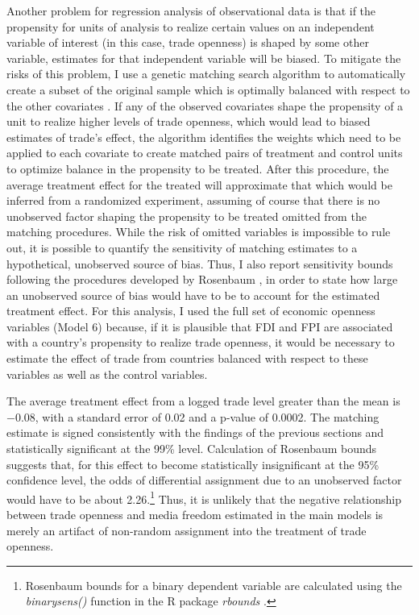 \documentclass[12pt,a4paper]{article}\usepackage[]{graphicx}\usepackage[]{color}
\begin{document}
Another problem for regression analysis of observational data is that if the propensity for units of analysis to realize certain values on an independent variable of interest (in this case, trade openness) is shaped by some other variable, estimates for that independent variable will be biased. To mitigate the risks of this problem, I use a genetic matching search algorithm to automatically create a subset of the original sample which is optimally balanced with respect to the other covariates \parencites{Diamond:2012jo}{Sekhon:2008wd}. If any of the observed covariates shape the propensity of a unit to realize higher levels of trade openness, which would lead to biased estimates of trade's effect, the algorithm identifies the weights which need to be applied to each covariate to create matched pairs of treatment and control units to optimize balance in the propensity to be treated. After this procedure, the average treatment effect for the treated will approximate that which would be inferred from a randomized experiment, assuming of course that there is no unobserved factor shaping the propensity to be treated omitted from the matching procedures. While the risk of omitted variables is impossible to rule out, it is possible to quantify the sensitivity of matching estimates to a hypothetical, unobserved source of bias. Thus, I also report sensitivity bounds following the procedures developed by Rosenbaum \parencite*{Rosenbaum:1988fl}, in order to state how large an unobserved source of bias would have to be to account for the estimated treatment effect. For this analysis, I used the full set of economic openness variables (Model 6) because, if it is plausible that FDI and FPI are associated with a country's propensity to realize trade openness, it would be necessary to estimate the effect of trade from countries balanced with respect to these variables as well as the control variables.

The average treatment effect from a logged trade level greater than the mean is \ensuremath{-0.08}, with a standard error of 0.02 and a p-value of 0.0002. The matching estimate is signed consistently with the findings of the previous sections and statistically significant at the 99\% level. Calculation of Rosenbaum bounds suggests that, for this effect to become statistically insignificant at the 95\% confidence level, the odds of differential assignment due to an unobserved factor would have to be about 2.26.\footnote{Rosenbaum bounds for a binary dependent variable are calculated using the \emph{binarysens()} function in the R package \emph{rbounds} \parencite{rboundsPerformRos:2014vj}.} Thus, it is unlikely that the negative relationship between trade openness and media freedom estimated in the main models is merely an artifact of non-random assignment into the treatment of trade openness.
\end{document}
